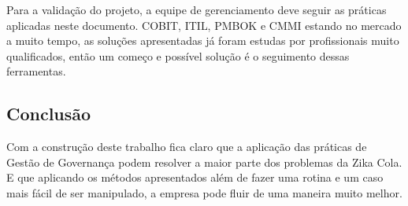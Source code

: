\documentclass[12pt]{article}
\begin{document}
Para a validação do projeto, a equipe de gerenciamento deve seguir as práticas aplicadas neste documento. COBIT, ITIL, PMBOK e CMMI estando no mercado a muito tempo, as soluções apresentadas já foram estudas por profissionais muito qualificados, então um começo e possível solução é o seguimento dessas ferramentas.

\subsection{Conclusão}

Com a construção deste trabalho fica claro que a aplicação das práticas de Gestão de Governança podem resolver a maior parte dos problemas da Zika Cola. E que aplicando os métodos apresentados além de fazer uma rotina e um caso mais fácil de ser manipulado, a empresa pode fluir de uma maneira muito melhor.
\end{document}
